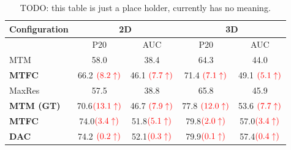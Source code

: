 \documentclass[10pt,twocolumn,letterpaper]{article}
\begin{document}
\begin{table}[t]
\small
   \centering
        \begin{tabular}{|l|| *{2}{c}| *{2}{c} |}\hline
            {\small Configuration} & \multicolumn{2}{|c|}{\small 2D}  & \multicolumn{2}{|c|}{\small 3D}  \\ \hline \hline
                                                    & P20       & AUC       & P20       & AUC  \\ \hline \hline

            {\small MTM }                          &  58.0     &  38.4     & 64.3      & 44.0   \\
            \hline
            {\small \textbf{MTFC} }  &  66.2 ${\color{red}(8.2\uparrow)}$    &  46.1 ${\color{red}(7.7\uparrow)}$    &  71.4 ${\color{red}(7.1\uparrow)}$     &  49.1 ${\color{red}(5.1\uparrow)}$\\
            \hline
            \hline
            {\small MaxRes }                        &  57.5     &  38.8     &  65.8     &  45.9  \\
            \hline
            {\small \textbf{MTM (GT)} }        &  70.6${\color{red}(13.1\uparrow)}$     &  46.7  ${\color{red}(7.9\uparrow)}$   &  77.8 ${\color{red}(12.0\uparrow)}$    &  53.6 ${\color{red}(7.7\uparrow)}$ \\
            \hline
            \hline
            {\small \textbf{MTFC}}           &  74.0${\color{red}(3.4\uparrow)}$      &  51.8${\color{red}(5.1\uparrow)}$      &  79.8${\color{red}(2.0\uparrow)}$      &  57.0${\color{red}(3.4\uparrow)}$    \\
            \hline
            {\small \textbf{DAC}}&  74.2 ${\color{red}(0.2\uparrow)}$    &  52.1${\color{red}(0.3\uparrow)}$     &  79.9${\color{red}(0.1\uparrow)}$     &  57.4${\color{red}(0.4\uparrow)}$\\\hline

        \end{tabular}

    \caption{ {\small
         TODO: this table is just a place holder, currently has no meaning.}
          } \label{table_baseline}
\end{table}
\end{document}
